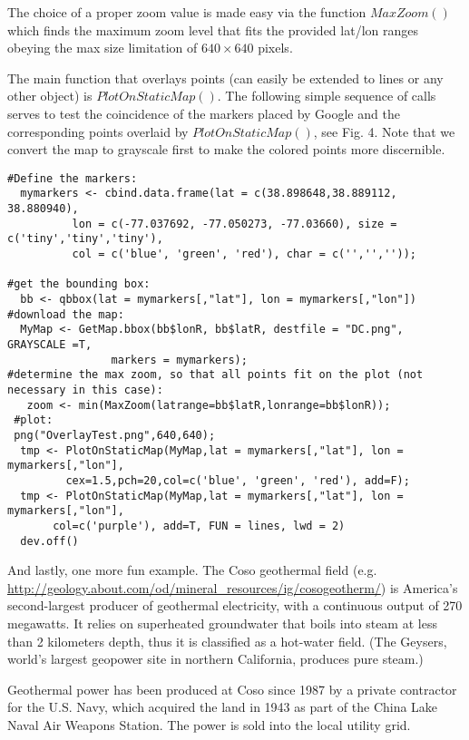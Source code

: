 \documentclass{article}
\begin{document}
\noindent The choice of a proper zoom value is made easy via the function $MaxZoom()$ which finds the maximum zoom level that fits the provided lat/lon ranges obeying the max size limitation of $640 \times 640$ pixels.

\noindent The main function that overlays points (can easily be extended to lines or any other object) is $PlotOnStaticMap()$.
The following simple sequence of calls serves to test the coincidence of the markers placed by Google and the corresponding points overlaid by $PlotOnStaticMap()$, see Fig. 4. Note that we convert the map to grayscale first to make the colored points more discernible.
\begin{verbatim}
#Define the markers:
  mymarkers <- cbind.data.frame(lat = c(38.898648,38.889112, 38.880940), 
          lon = c(-77.037692, -77.050273, -77.03660), size =  c('tiny','tiny','tiny'), 
          col = c('blue', 'green', 'red'), char = c('','',''));

#get the bounding box:
  bb <- qbbox(lat = mymarkers[,"lat"], lon = mymarkers[,"lon"])
#download the map:
  MyMap <- GetMap.bbox(bb$lonR, bb$latR, destfile = "DC.png", GRAYSCALE =T,
                markers = mymarkers);
#determine the max zoom, so that all points fit on the plot (not necessary in this case):  
   zoom <- min(MaxZoom(latrange=bb$latR,lonrange=bb$lonR));
 #plot:
 png("OverlayTest.png",640,640);
  tmp <- PlotOnStaticMap(MyMap,lat = mymarkers[,"lat"], lon = mymarkers[,"lon"], 
         cex=1.5,pch=20,col=c('blue', 'green', 'red'), add=F);
  tmp <- PlotOnStaticMap(MyMap,lat = mymarkers[,"lat"], lon = mymarkers[,"lon"], 
       col=c('purple'), add=T, FUN = lines, lwd = 2)
  dev.off()
\end{verbatim}

\noindent And lastly, one more fun example. The Coso geothermal field (e.g. \url{http://geology.about.com/od/mineral_resources/ig/cosogeotherm/}) is America's second-largest producer of geothermal electricity, with a continuous output of 270 megawatts. It relies on superheated groundwater that boils into steam at less than 2 kilometers depth, thus it is classified as a hot-water field. (The Geysers, world's largest geopower site in northern California, produces pure steam.)

\noindent Geothermal power has been produced at Coso since 1987 by a private contractor for the U.S. Navy, which acquired the land in 1943 as part of the China Lake Naval Air Weapons Station. The power is sold into the local utility grid.
\end{document}
